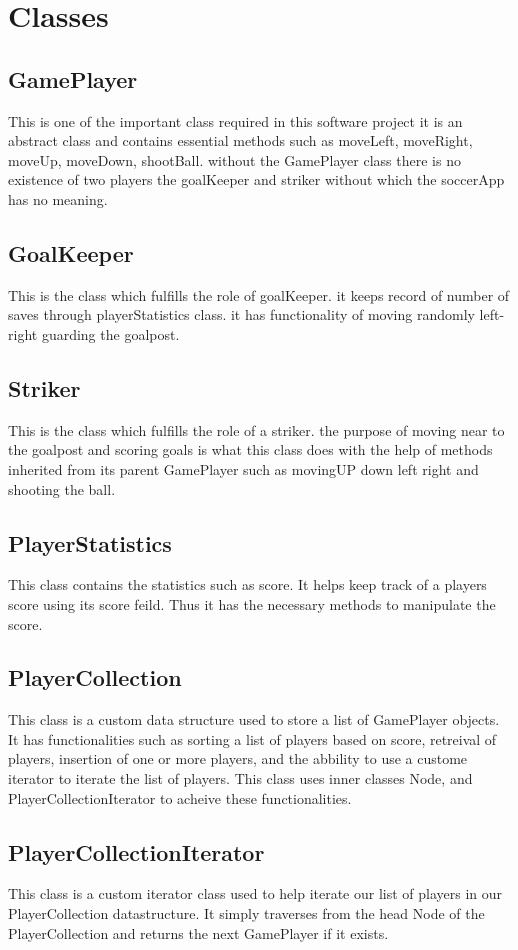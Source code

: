 \documentclass[12pt, dvipsnames, a4paper]{article}
\begin{document}
\section{Classes}
\subsection{GamePlayer}
This is one of the important class required in this software project it is an abstract class
and contains  essential methods such as moveLeft, moveRight, moveUp, moveDown, shootBall. without the GamePlayer
class there is no existence of two players the goalKeeper and striker without which the soccerApp has no meaning.
\subsection{GoalKeeper}
This is the class which fulfills the role of goalKeeper. it keeps record of number of saves through
playerStatistics class. it has functionality of moving randomly left-right guarding the goalpost.
\subsection{Striker}
This is the class which fulfills the role of a striker. the purpose of moving near to the goalpost
and scoring goals is what this class does with the help of methods inherited from its parent GamePlayer such as
movingUP down left right and shooting the ball.
\subsection{PlayerStatistics}
This class contains the statistics such as score. It helps keep track of a players score using its score feild.
Thus it has the necessary methods to manipulate the score.
\subsection{PlayerCollection}
This class is a custom data structure used to store a list of GamePlayer objects. It has functionalities such as
sorting a list of players based on score, retreival of players, insertion of one or more players, and
the abbility to use a custome iterator to iterate the list of players. This class
uses inner classes Node, and PlayerCollectionIterator to acheive these functionalities.
\subsection{PlayerCollectionIterator}
This class is a custom iterator class used to help iterate our list of players in our PlayerCollection datastructure.
It simply traverses from the head Node of the PlayerCollection and returns the next GamePlayer if
it exists.
\end{document}
